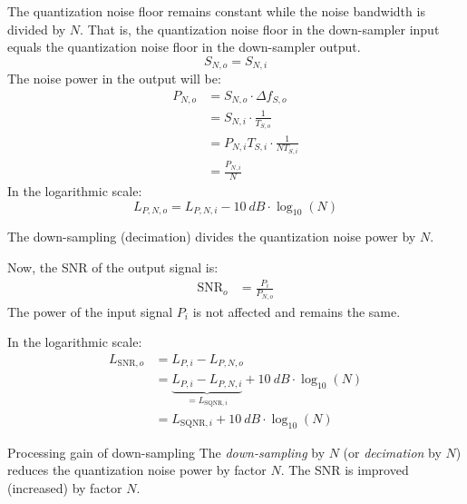 \begin{refsection}
The quantization noise floor remains constant while the noise bandwidth is divided by $N$. That is, the quantization noise floor in the down-sampler input equals the quantization noise floor in the down-sampler output.
\begin{equation}
	S_{N,o} = S_{N,i}
\end{equation}
The noise power in the output will be:
\begin{equation}
	\begin{split}
		P_{N,o} &= S_{N,o} \cdot \Delta f_{S,o} \\
		 &= S_{N,i} \cdot \frac{1}{T_{S,o}} \\
		 &= P_{N,i} T_{S,i} \cdot \frac{1}{N T_{S,i}} \\
		 &= \frac{P_{N,i}}{N}
	\end{split}
\end{equation}
In the logarithmic scale:
\begin{equation}
	L_{P,N,o} = L_{P,N,i} - \SI{10}{dB} \cdot \log_{10} \left(N\right)
\end{equation}

\begin{fact}
	The down-sampling (decimation) divides the quantization noise power by $N$.
\end{fact}

Now, the \ac{SNR} of the output signal is:
\begin{equation}
	\begin{split}
		\mathrm{SNR}_o &= \frac{P_i}{P_{N,o}}
	\end{split}
\end{equation}
The power of the input signal $P_i$ is not affected and remains the same.

In the logarithmic scale:
\begin{equation}
	\begin{split}
		L_{\mathrm{SNR},o} &= L_{P,i} - L_{P,N,o} \\
		 &= \underbrace{L_{P,i} - L_{P,N,i}}_{= L_{\mathrm{SQNR},i}} + \SI{10}{dB} \cdot \log_{10} \left(N\right) \\
		 &= L_{\mathrm{SQNR},i} + \SI{10}{dB} \cdot \log_{10} \left(N\right)
	\end{split}
\end{equation}

\begin{definition}{Processing gain of down-sampling}
	The \emph{down-sampling} by $N$ (or \emph{decimation} by $N$) reduces the quantization noise power by factor $N$. The \ac{SNR} is improved (increased) by factor $N$.
	

\end{definition}
\end{refsection}

